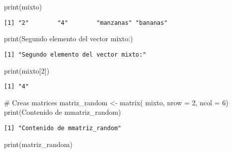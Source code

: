 \documentclass[
  letterpaper,
  DIV=11,
  numbers=noendperiod]{scrartcl}
\newenvironment{Shaded}{\begin{snugshade}}{\end{snugshade}}
\newcommand{\AttributeTok}[1]{\textcolor[rgb]{0.40,0.45,0.13}{#1}}
\newcommand{\CommentTok}[1]{\textcolor[rgb]{0.37,0.37,0.37}{#1}}
\newcommand{\DecValTok}[1]{\textcolor[rgb]{0.68,0.00,0.00}{#1}}
\newcommand{\FunctionTok}[1]{\textcolor[rgb]{0.28,0.35,0.67}{#1}}
\newcommand{\NormalTok}[1]{\textcolor[rgb]{0.00,0.23,0.31}{#1}}
\newcommand{\OtherTok}[1]{\textcolor[rgb]{0.00,0.23,0.31}{#1}}
\newcommand{\StringTok}[1]{\textcolor[rgb]{0.13,0.47,0.30}{#1}}
\begin{document}
\begin{Shaded}
\begin{Highlighting}[]
\FunctionTok{print}\NormalTok{(mixto)}
\end{Highlighting}
\end{Shaded}

\begin{verbatim}
[1] "2"        "4"        "manzanas" "bananas" 
\end{verbatim}

\begin{Shaded}
\begin{Highlighting}[]
\FunctionTok{print}\NormalTok{(}\StringTok{\textquotesingle{}Segundo elemento del vector mixto:\textquotesingle{}}\NormalTok{)}
\end{Highlighting}
\end{Shaded}

\begin{verbatim}
[1] "Segundo elemento del vector mixto:"
\end{verbatim}

\begin{Shaded}
\begin{Highlighting}[]
\FunctionTok{print}\NormalTok{(mixto[}\DecValTok{2}\NormalTok{])}
\end{Highlighting}
\end{Shaded}

\begin{verbatim}
[1] "4"
\end{verbatim}

\begin{Shaded}
\begin{Highlighting}[]
\CommentTok{\# Creas matrices}
\NormalTok{matriz\_random }\OtherTok{\textless{}{-}} \FunctionTok{matrix}\NormalTok{( mixto, }\AttributeTok{nrow =} \DecValTok{2}\NormalTok{, }\AttributeTok{ncol =} \DecValTok{6}\NormalTok{)}
\FunctionTok{print}\NormalTok{(}\StringTok{\textquotesingle{}Contenido de mmatriz\_random\textquotesingle{}}\NormalTok{)}
\end{Highlighting}
\end{Shaded}

\begin{verbatim}
[1] "Contenido de mmatriz_random"
\end{verbatim}

\begin{Shaded}
\begin{Highlighting}[]
\FunctionTok{print}\NormalTok{(matriz\_random)}
\end{Highlighting}
\end{Shaded}
\end{document}
